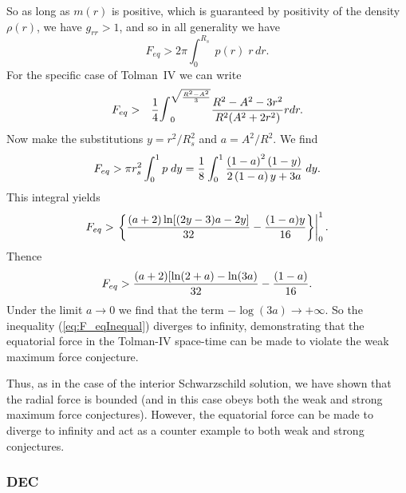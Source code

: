 \documentclass[12pt]{article}
\begin{document}
So as long as $m(r)$ is positive, which is guaranteed by positivity of the density $\rho(r)$, we have $g_{rr}>1$, and so in all generality we have 
\begin{equation}
F_{eq} >  2\pi\int^{R_s}_0 \;p(r)\; r\, dr. 
\end{equation}
For the specific case of Tolman~IV we can write 
\begin{eqnarray}
    F_{eq}
    &>&  \frac{1}{4 }\hbox{\Large $\displaystyle\int$}^{\sqrt{\frac{R^2 - A^2}{3}}}_0 \frac{R^2 - A^2 - 3r^2}{R^2(A^2 + 2r^2)} r dr.
\end{eqnarray}
Now make the substitutions $y= r^2/R_s^2$ and $a=A^2/R^2$. We find
\begin{equation}
F_{eq} > \pi r_s^2 \int^{1}_0p\; dy =
{1\over 8} \int^{1}_0 \frac{\left(1-a\right)^2  \left(1-y\right)}{2 \left(1-a\right) y+3 a} \; dy. 
\end{equation}
This integral yields
\begin{equation}
F_{eq} > \left. \left\{{(a+2)\ln[(2y-3)a-2y]\over32}  -{(1-a)y\over16} \right\} \right|_0^1. 
\end{equation}
Thence
\begin{equation}
F_{eq} > {(a+2)[\ln(2+a)-\ln(3a)\over32}  -{(1-a)\over16}. 
\label{eq:F_eqInequal}
\end{equation}
%
Under the limit $a\rightarrow0$ we find that the term $-\log(3a) \rightarrow +\infty$. So the inequality  (\ref{eq:F_eqInequal}) diverges to infinity, demonstrating that the equatorial force in the Tolman-IV space-time can be made to violate the weak maximum force conjecture.

Thus, as in the case of the interior Schwarzschild solution, we have shown that the radial force is bounded (and in this case obeys both the weak and strong maximum force conjectures). However, the equatorial force can be made to diverge to infinity and act as a counter example to both weak and strong conjectures.

\subsubsection{DEC}
\end{document}
